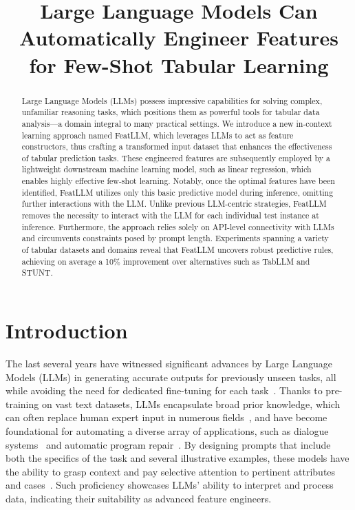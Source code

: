 \title{Large Language Models Can Automatically Engineer Features for Few-Shot Tabular Learning}

\begin{abstract}
Large Language Models (LLMs) possess impressive capabilities for solving complex, unfamiliar reasoning tasks, which positions them as powerful tools for tabular data analysis—a domain integral to many practical settings. We introduce a new in-context learning approach named \textsf{FeatLLM}, which leverages LLMs to act as feature constructors, thus crafting a transformed input dataset that enhances the effectiveness of tabular prediction tasks. These engineered features are subsequently employed by a lightweight downstream machine learning model, such as linear regression, which enables highly effective few-shot learning. Notably, once the optimal features have been identified, \textsf{FeatLLM} utilizes only this basic predictive model during inference, omitting further interactions with the LLM. Unlike previous LLM-centric strategies, \textsf{FeatLLM} removes the necessity to interact with the LLM for each individual test instance at inference. Furthermore, the approach relies solely on API-level connectivity with LLMs and circumvents constraints posed by prompt length. Experiments spanning a variety of tabular datasets and domains reveal that \textsf{FeatLLM} uncovers robust predictive rules, achieving on average a 10\% improvement over alternatives such as TabLLM and STUNT.
\end{abstract}

\section{Introduction}
The last several years have witnessed significant advances by Large Language Models (LLMs) in generating accurate outputs for previously unseen tasks, all while avoiding the need for dedicated fine-tuning for each task~\cite{creswell2022selection,imani2023mathprompter,taylor2022galactica}. Thanks to pre-training on vast text datasets, LLMs encapsulate broad prior knowledge, which can often replace human expert input in numerous fields~\cite{Genomes2021,singhal2023large,wilcox2003role}, and have become foundational for automating a diverse array of applications, such as dialogue systems~\cite{finch2023leveraging} and automatic program repair~\cite{fan2023automated}. By designing prompts that include both the specifics of the task and several illustrative examples, these models have the ability to grasp context and pay selective attention to pertinent attributes and cases~\cite{brown2020language,zhao2023survey}. Such proficiency showcases LLMs’ ability to interpret and process data, indicating their suitability as advanced feature engineers.

